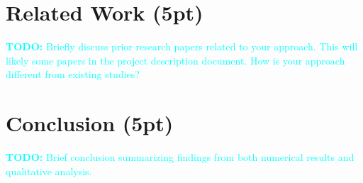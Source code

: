 \documentclass[twocolumn]{article}
\newcommand{\todo}[1]{\textcolor{cyan}{\textbf{TODO:} #1}}
\begin{document}



 \section{Related Work (5pt)}
\todo{Briefly discuss prior research papers related to your approach. This will likely some papers in the project description document. How is your approach different from existing studies?}




\section{Conclusion (5pt)}
\todo{Brief conclusion summarizing findings from both numerical results and qualitative analysis.}
\end{document}
